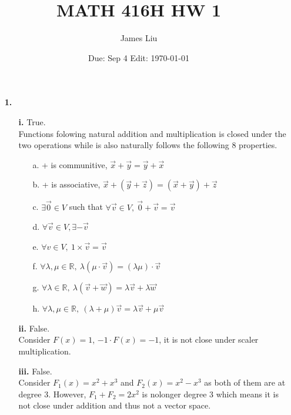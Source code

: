 \documentclass{article}
\date{Due: Sep 4 Edit: \today}
\title{MATH 416H HW 1}
\author{James Liu}
\begin{document}
\maketitle

\begin{itemize}
    \item [\textbf{1.}] 
    \begin{itemize}
        \item [\textbf{i.}] True.\\
        Functions folowing  natural addition and multiplication is closed under the two operations while is also naturally follows the following 8 properties.
        \begin{itemize}
            \item [a.] + is communitive, \(\overrightarrow{x}+\overrightarrow{y}=\overrightarrow{y}+\overrightarrow{x}\)
            \item [b.] + is associative, \(\overrightarrow{x}+(\overrightarrow{y}+\overrightarrow{z})=(\overrightarrow{x}+\overrightarrow{y})+\overrightarrow{z}\)
            \item [c.] \(\exists \overrightarrow{0}\in V\) such that \(\forall \overrightarrow{v}\in V,\ \overrightarrow{0}+\overrightarrow{v}=\overrightarrow{v}\)
            \item [d.] \(\forall \overrightarrow{v}\in V, \exists -\overrightarrow{v}\)
            \item [e.] \(\forall v\in V, \ 1\times \overrightarrow{v}=\overrightarrow{v}\)
            \item [f.] \(\forall \lambda,\mu\in\mathbb{R},\ \lambda(\mu\cdot\overrightarrow{v})=(\lambda\mu)\cdot \overrightarrow{v}\)
            \item [g.] \(\forall \lambda\in\mathbb{R},\ \lambda(\overrightarrow{v}+\overrightarrow{w})=\lambda \overrightarrow{v}+\lambda\overrightarrow{w}\)
            \item [h.] \(\forall \lambda,\mu\in\mathbb{R},\ (\lambda+\mu)\overrightarrow{v}=\lambda\overrightarrow{v}+\mu\overrightarrow{v}\)
        \end{itemize}
        \item [\textbf{ii.}] False.\\
        Consider \(F(x)=1\), \(-1\cdot F(x)= -1\), it is not close under scaler multiplication.
        \item [\textbf{iii.}] False.\\
        Consider \(F_1(x) = x^2+x^3\) and \(F_2(x) = x^2-x^3\) as both of them are at degree 3. However, \(F_1+F_2=2x^2\) is nolonger degree 3 which means it is not close under addition and thus not a vector space.

\end{itemize}
\end{itemize}
\end{document}
